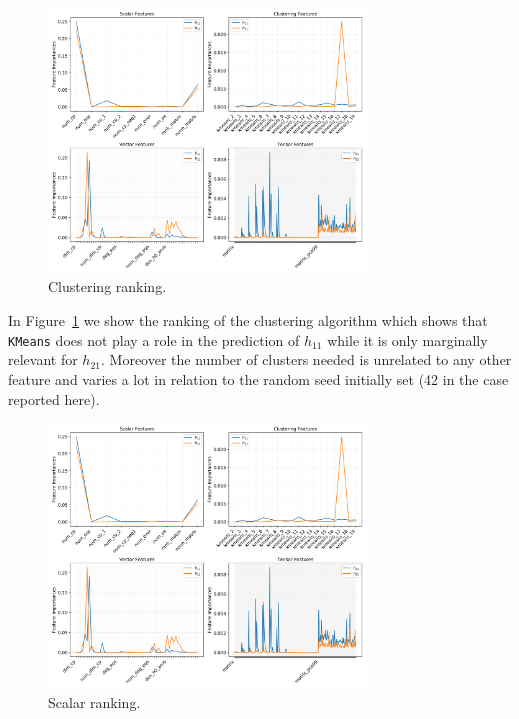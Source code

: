     \begin{figure}[!t]
        \centering
        \includegraphics[width=0.75\textwidth,
                         trim={6in 5in 0 0},
                         clip
                        ]{tex/img/feature_importances.png}
        \caption{Clustering ranking.}
        \label{fig:clustering_importances}
    \end{figure}
    
    In Figure~\ref{fig:clustering_importances} we show the ranking of the clustering algorithm which shows that \texttt{KMeans} does not play a role in the prediction of $h_{11}$ while it is only marginally relevant for $h_{21}$. Moreover the number of clusters needed is unrelated to any other feature and varies a lot in relation to the random seed initially set (42 in the case reported here).
    
    \begin{figure}[!t]
        \centering
        \includegraphics[width=0.75\textwidth,
                         trim={0 5in 6in 0},
                         clip
                        ]{tex/img/feature_importances.png}
        \caption{Scalar ranking.}
        \label{fig:scalar_importances}
    \end{figure}
    
